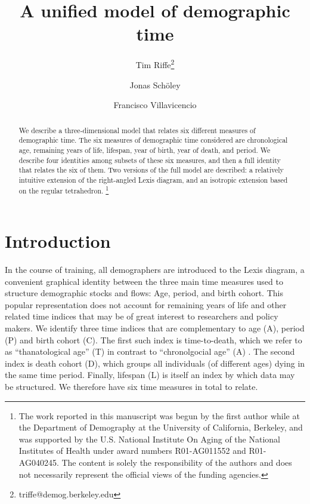 \documentclass[12pt,oneside,letter]{article} %
\newcommand\ackn[1]{%
  \begingroup
  \renewcommand\thefootnote{}\footnote{#1}%
  \addtocounter{footnote}{-1}%
  \endgroup
}
\begin{document}
\title{A unified model of demographic time}

\author[1]{Tim Riffe\thanks{triffe@demog.berkeley.edu}}
\author[2,3]{Jonas Sch{\"o}ley}
\author[2,3]{Francisco Villavicencio}


\maketitle

\begin{abstract}
We describe a three-dimensional model that relates six different measures of
demographic time. The six measures of demographic time considered are
chronological age, remaining years of life, lifespan, year of birth, year of
death, and period. We describe four identities among subsets of these six
measures, and then a full identity that relates the six of them. Two versions of
the full model are described: a relatively intuitive extension of the
right-angled Lexis diagram, and an isotropic extension based on the regular tetrahedron. \ackn{The work reported in this manuscript was begun by
the first author while at the Department of Demography at the University of
California, Berkeley, and was supported by the U.S.
National Institute On Aging of the National Institutes of Health under award
numbers R01-AG011552 and R01-AG040245. The content is solely the responsibility of the authors and does not necessarily represent the official views of the funding agencies.}
\end{abstract}

\section*{Introduction}
In the course of training, all demographers are introduced
to the Lexis diagram, a convenient graphical identity between the three main
time measures used to structure demographic stocks and flows: Age, period, and birth cohort.
This popular representation does not account for remaining years of life and
other related time indices that may be of great interest to researchers and policy makers.
We identify three time indices that are complementary to age (A), period (P) and
birth cohort (C). The first such index is time-to-death, which we refer to as ``thanatological age'' (T) in contrast to ``chronolgocial age'' (A)
\citep{riffe2015force}. The second index is death cohort (D), which groups
all individuals (of different ages) dying in the same time period. Finally,
lifespan (L) is itself an index by which data may be structured. We therefore
have six time measures in total to relate.
\end{document}
